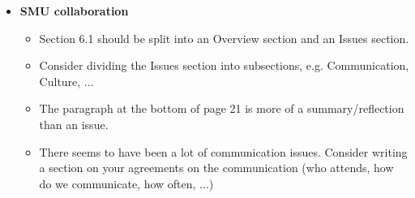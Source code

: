\documentclass[]{article}
\begin{document}
\begin{itemize}
\item \textbf{SMU collaboration}
	\begin{itemize}
	\item Section 6.1 should be split into an Overview section and an Issues section.
	\item Consider dividing the Issues section into subsections, e.g. Communication, Culture, ...
	\item The paragraph at the bottom of page 21 is more of a summary/reflection than an issue.
	\item There seems to have been a lot of communication issues. Consider writing a section on your agreements on the communication (who attends, how do we communicate, how often, ...)
	\end{itemize}
\end{itemize}
\end{document}
